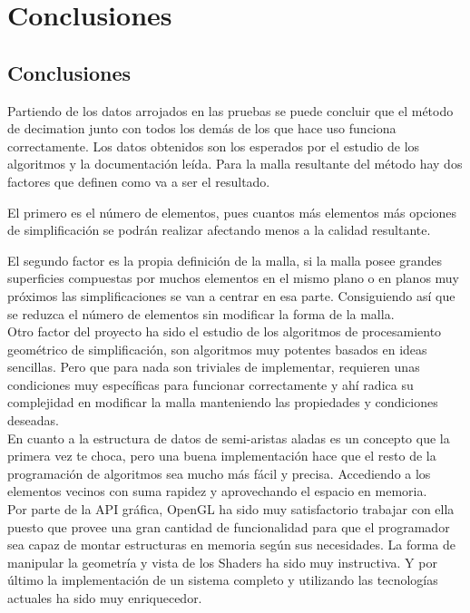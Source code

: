 \chapter{ Conclusiones}

\section{ Conclusiones}

Partiendo de los datos arrojados en las pruebas se puede concluir que el método de decimation junto con todos los demás de los que hace uso funciona correctamente. Los datos obtenidos son los esperados por el estudio de los algoritmos y la documentación leída. Para la malla resultante del método hay dos factores que definen como va a ser el resultado.

El primero es el número de elementos, pues cuantos más elementos más opciones de simplificación se podrán realizar afectando menos a la calidad resultante.

El segundo factor es la propia definición de la malla, si la malla posee grandes superficies compuestas por muchos elementos en el mismo plano o en planos muy próximos las simplificaciones se van a centrar en esa parte. Consiguiendo así que se reduzca el número de elementos sin modificar la forma de la malla.\\

Otro factor del proyecto ha sido el estudio de los algoritmos de procesamiento geométrico de simplificación, son algoritmos muy potentes basados en ideas sencillas. Pero que para nada son triviales de implementar, requieren unas condiciones muy específicas para funcionar correctamente y ahí radica su complejidad en modificar la malla manteniendo las propiedades y condiciones deseadas.\\

En cuanto a la estructura de datos de semi-aristas aladas es un concepto que la primera vez te choca, pero una buena implementación hace que el resto de la programación de algoritmos sea mucho más fácil y precisa. Accediendo a los elementos vecinos con suma rapidez y aprovechando el espacio en memoria.\\

Por parte de la API gráfica, OpenGL ha sido muy satisfactorio trabajar con ella puesto que provee una gran cantidad de funcionalidad para que el programador sea capaz de montar estructuras en memoria según sus necesidades. La forma de manipular la geometría y vista de los Shaders ha sido muy instructiva. Y por último la implementación de un sistema completo y utilizando las tecnologías actuales ha sido muy enriquecedor.\\


